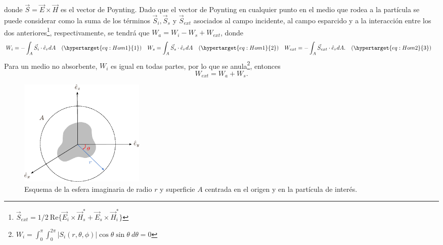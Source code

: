 donde $\Vec{S}=\Vec{E}\times\Vec{H}$ es el vector de Poynting. Dado que el vector de Poynting en cualquier punto en el medio que rodea a la partícula se puede considerar como la suma de los términos $\Vec{S}_i, \Vec{S}_s$ y $\Vec{S}_{ext}$  \cite{Bohren} asociados al campo incidente, al campo esparcido y a la interacción entre los dos anteriores\footnote{$\Vec{S}_{ext}=1/2\:\mbox{Re}\{\Vec{E}_i\times\Vec{H}_s^*+\Vec{E}_s\times\Vec{H}_i^*\}$ }, respectivamente, se tendrá que $W_a=W_i-W_s+W_{ext}$, donde
\begin{subequations}
	\begin{align}
			W_i & = -\int_{A}\Vec{S}_i\cdot\hat{e}_rdA 
		&& (\stepcounter{equation}\hypertarget{eq:Hom1}{\text{\theequation}}) 
		& W_s &=\int_{A}\Vec{S}_s\cdot\hat{e}_rdA \label{eq:MW1a}&& (\stepcounter{equation}\hypertarget{eq:Hom1}{\text{\theequation}}) &
		W_{ext}& = -\int_{A}\Vec{S}_{ext}\cdot\hat{e}_rdA. && (\stepcounter{equation}\hypertarget{eq:Hom2}{\text{\theequation}}) & \nonumber
	\end{align}
\end{subequations}
Para un medio no absorbente, $W_i$ es igual en todas partes, por lo que se anula\footnote{$W_i =\int_{0}^{\pi}\int_{0}^{2\pi}|S_i(r,\theta,\phi)|\cos\theta \sin\theta \: d\theta=0$}, entonces
\begin{equation}
	W_{ext}=W_a+W_s.
\end{equation}
\begin{figure}[h!]
	\centering
	\includegraphics[width=6cm]{../../Figuras/WA}
	\caption{Esquema de la esfera imaginaria  de radio $r$ y superficie $A$ centrada en el origen y en la partícula de interés.}
	\label{WA}
\end{figure}

